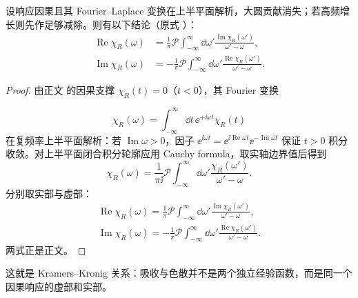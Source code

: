 \begin{proposition}
设响应因果且其 Fourier--Laplace 变换在上半平面解析，大圆贡献消失；若高频增长则先作足够减除。则有以下结论（原式 ）：
\begin{equation*}
 \boxed{
 \begin{aligned}
 \operatorname{Re}\chi_R(\omega)
 &=\frac1\pi\mathcal P\int_{-\infty}^{\infty}\dd\omega'
 \frac{\operatorname{Im}\chi_R(\omega')}{\omega'-\omega},\\
 \operatorname{Im}\chi_R(\omega)
 &=-\frac1\pi\mathcal P\int_{-\infty}^{\infty}\dd\omega'
 \frac{\operatorname{Re}\chi_R(\omega')}{\omega'-\omega}.
 \end{aligned}}
\end{equation*}
\end{proposition}
\begin{proof}
由正文 的因果支撑 $\chi_R(t)=0$（$t<0$），其 Fourier 变换

\begin{equation*}
 \chi_R(\omega)=\int_{-\infty}^{\infty}\dd t\,\ee^{+\ii\omega t}\chi_R(t)
\end{equation*}
在复频率上半平面解析：若 $\operatorname{Im}\omega>0$，因子 $\ee^{\ii\omega t}=\ee^{\ii\operatorname{Re}\omega t}\ee^{-\operatorname{Im}\omega t}$ 保证 $t>0$ 积分收敛。对上半平面闭合积分轮廓应用 Cauchy formula，取实轴边界值后得到
\begin{equation*}
 \chi_R(\omega)
 =\frac1{\pi\ii}
 \mathcal P\int_{-\infty}^{\infty}\dd\omega'
 \frac{\chi_R(\omega')}{\omega'-\omega}.
\end{equation*}
分别取实部与虚部：
\begin{align*}
 {
 \operatorname{Re}\chi_R(\omega)
 =\frac1\pi\mathcal P\int_{-\infty}^{\infty}\dd\omega'
 \frac{\operatorname{Im}\chi_R(\omega')}{\omega'-\omega}},\\
 {
 \operatorname{Im}\chi_R(\omega)
 =-\frac1\pi\mathcal P\int_{-\infty}^{\infty}\dd\omega'
 \frac{\operatorname{Re}\chi_R(\omega')}{\omega'-\omega}}.
 \end{align*}
两式正是正文。
\end{proof}

这就是 Kramers--Kronig 关系：吸收与色散并不是两个独立经验函数，而是同一个因果响应的虚部和实部。


